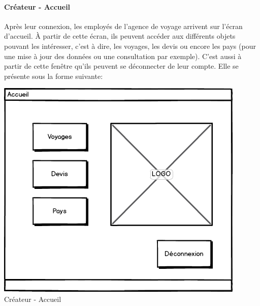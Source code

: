 \documentclass[11pt]{article}
\begin{document}
\paragraph{Créateur - Accueil}
Après leur connexion, les employés de l'agence de voyage arrivent sur l'écran d'accueil. À	partir de cette écran, ils peuvent accéder aux différents objets pouvant les intéresser, c'est à dire, les voyages, les devis ou encore les pays (pour une mise à jour des données ou une consultation par exemple). C'est aussi à partir de cette fenêtre qu'ils peuvent se déconnecter de leur compte. Elle se présente sous la forme suivante:
\begin{center}
\includegraphics[scale = 0.5]{../Conception_graphique/png_Pour_CR/Createur-10-Accueil.png}
\newline
Créateur - Accueil
\label{fig:Cr-Accueil}
\end{center}
\end{document}
